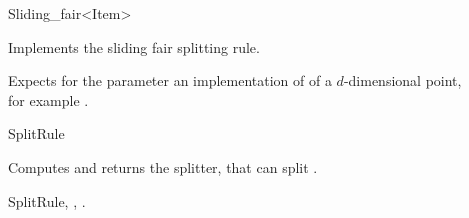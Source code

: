 

\begin{ccRefFunctionObjectClass}{Sliding_fair<Item>}  %




\ccDefinition
Implements the sliding fair splitting rule.


\ccParameters

Expects for the parameter  an implementation of
of a $d$-dimensional point, \\
for example .

\ccIsModel

SplitRule

\ccTypes


\ccCreation
{}  %



{Computes and returns the splitter, that can split .}

\ccSeeAlso

SplitRule,
,
.
\end{ccRefFunctionObjectClass}


